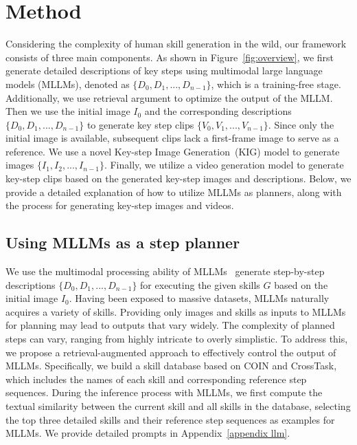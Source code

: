 

\section{Method}


Considering the complexity of human skill generation in the wild, our framework consists of three main components. As shown in Figure~\ref{fig:overview}, we first generate detailed descriptions of key steps using multimodal large language models (MLLMs), denoted as $\{D_0, D_1,...,D_{n-1}\}$, which is a training-free stage. Additionally, we use retrieval argument to optimize the output of the MLLM. Then we use the initial image $I_0$ and the corresponding descriptions $\{D_0, D_1,...,D_{n-1}\}$ to generate key step clips $\{V_0, V_1,...,V_{n-1}\}$. Since only the initial image is available, subsequent clips lack a first-frame image to serve as a reference. We use a novel Key-step Image Generation~(KIG) model to generate images $\{I_1, I_2,...,I_{n-1}\}$. Finally, we utilize a video generation model to generate key-step clips based on the generated key-step images and descriptions. Below, we provide a detailed explanation of how to utilize MLLMs as planners, along with the process for generating key-step images and videos. 

\subsection{Using MLLMs as a step planner}
\label{sec: planning}
We use the multimodal processing ability of MLLMs~\cite{gpt-4o,gpt-4o-mini,claude} generate step-by-step descriptions $\{D_0, D_1,...,D_{n-1}\}$ for executing the given skills $G$ based on the initial image $I_0$. Having been exposed to massive datasets, MLLMs naturally acquires a variety of skills. Providing only images and skills as inputs to MLLMs for planning may lead to outputs that vary widely. The complexity of planned steps can vary, ranging from highly intricate to overly simplistic. To address this, we propose a retrieval-augmented approach to effectively control the output of MLLMs. Specifically, we build a skill database based on COIN and CrossTask, which includes the names of each skill and corresponding reference step sequences. During the inference process with MLLMs, we first compute the textual similarity between the current skill and all skills in the database, selecting the top three detailed skills and their reference step sequences as examples for MLLMs. We provide detailed prompts in Appendix~\ref{appendix llm}.

